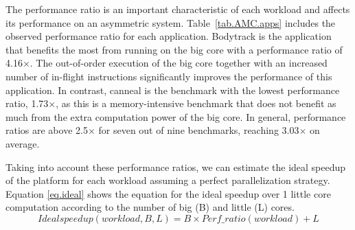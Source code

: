 
The performance ratio is an important characteristic of each workload and affects its performance on an asymmetric system.
Table~\ref{tab.AMC.apps} includes the observed performance ratio for each application. 
Bodytrack is the application that benefits the most from running on the big core with a performance ratio of 4.16$\times$. 
The out-of-order execution of the big core together with an increased number of in-flight instructions significantly improves the performance of this application. 
In contrast, canneal is the benchmark with the lowest performance ratio, 1.73$\times$, as this is a memory-intensive benchmark that does not benefit as much from the extra computation power of the big core. 
In general, performance ratios are above 2.5$\times$ for seven out of nine benchmarks, reaching 3.03$\times$ on average. 


Taking into account these performance ratios, we can estimate the ideal speedup of the platform for 
each workload assuming a perfect parallelization strategy. Equation \ref{eq.ideal} shows the 
equation for the ideal speedup over 1 little core computation according to the number of big (B) and 
little (L) cores.
\begingroup\makeatletter\def\f@size{10}\check@mathfonts
\begin{equation}
\text{$Ideal speedup(workload, B, L)$} = \text{$B \times Perf\_ratio(workload) + L$}
\label{eq.ideal}
\end{equation}
\endgroup


